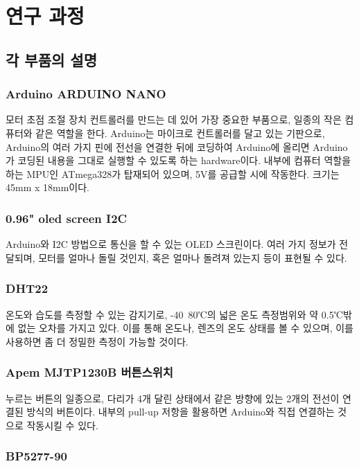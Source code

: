 \section{연구 과정}

\subsection{각 부품의 설명}

\subsubsection{Arduino ARDUINO NANO}

모터 초점 조절 장치 컨트롤러를 만드는 데 있어 가장 중요한 부품으로, 일종의 작은 컴퓨터와 같은 역할을 한다. Arduino는 마이크로 컨트롤러를 달고 있는 기판으로, Arduino의 여러 가지 핀에 전선을 연결한 뒤에 코딩하여 Arduino에 올리면 Arduino가 코딩된 내용을 그대로 실행할 수 있도록 하는 hardware이다. 내부에 컴퓨터 역할을 하는 MPU인 ATmega328가 탑재되어 있으며, 5V를 공급할 시에 작동한다. 크기는 45mm x 18mm이다.

\subsubsection{0.96" oled screen I2C}

Arduino와 I2C 방법으로 통신을 할 수 있는 OLED 스크린이다. 여러 가지 정보가 전달되며, 모터를 얼마나 돌릴 것인지, 혹은 얼마나 돌려져 있는지 등이 표현될 수 있다.

\subsubsection{DHT22}

온도와 습도를 측정할 수 있는 감지기로, -40~80℃의 넓은 온도 측정범위와 약 0.5℃밖에 없는 오차를 가지고 있다. 이를 통해 온도나, 렌즈의 온도 상태를 볼 수 있으며, 이를 사용하면 좀 더 정밀한 측정이 가능할 것이다.

\subsubsection{Apem MJTP1230B 버튼스위치}

누르는 버튼의 일종으로, 다리가 4개 달린 상태에서 같은 방향에 있는 2개의 전선이 연결된 방식의 버튼이다. 내부의 pull-up 저항을 활용하면 Arduino와 직접 연결하는 것으로 작동시킬 수 있다.

\subsubsection{BP5277-90}

